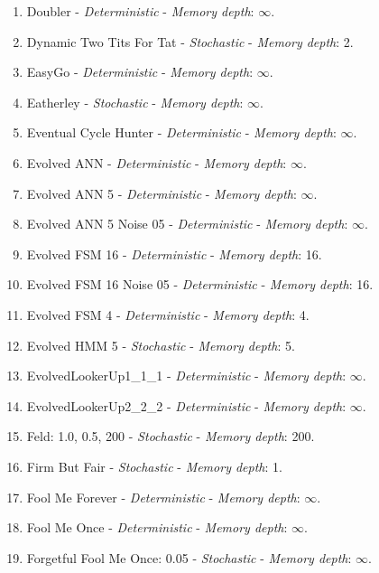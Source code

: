 \documentclass[10pt,letterpaper]{article}
\begin{document}
\begin{enumerate}
\item Doubler - \textit{Deterministic} - \textit{Memory depth}: \(\infty\). \cite{Prison1998}
\item Dynamic Two Tits For Tat - \textit{Stochastic} - \textit{Memory depth}: 2. \cite{axelrodproject}
\item EasyGo - \textit{Deterministic} - \textit{Memory depth}: \(\infty\). \cite{Li2011, Prison1998}
\item Eatherley - \textit{Stochastic} - \textit{Memory depth}: \(\infty\). \cite{Axelrod1980b}
\item Eventual Cycle Hunter - \textit{Deterministic} - \textit{Memory depth}: \(\infty\). \cite{axelrodproject}
\item Evolved ANN - \textit{Deterministic} - \textit{Memory depth}: \(\infty\). \cite{axelrodproject}
\item Evolved ANN 5 - \textit{Deterministic} - \textit{Memory depth}: \(\infty\). \cite{axelrodproject}
\item Evolved ANN 5 Noise 05 - \textit{Deterministic} - \textit{Memory depth}: \(\infty\). \cite{axelrodproject}
\item Evolved FSM 16 - \textit{Deterministic} - \textit{Memory depth}: 16. \cite{axelrodproject}
\item Evolved FSM 16 Noise 05 - \textit{Deterministic} - \textit{Memory depth}: 16. \cite{axelrodproject}
\item Evolved FSM 4 - \textit{Deterministic} - \textit{Memory depth}: 4. \cite{axelrodproject}
\item Evolved HMM 5 - \textit{Stochastic} - \textit{Memory depth}: 5. \cite{axelrodproject}
\item EvolvedLookerUp1\_1\_1 - \textit{Deterministic} - \textit{Memory depth}: \(\infty\). \cite{axelrodproject}
\item EvolvedLookerUp2\_2\_2 - \textit{Deterministic} - \textit{Memory depth}: \(\infty\). \cite{axelrodproject}
\item Feld: 1.0, 0.5, 200 - \textit{Stochastic} - \textit{Memory depth}: 200. \cite{Axelrod1980}
\item Firm But Fair - \textit{Stochastic} - \textit{Memory depth}: 1. \cite{Frean1994}
\item Fool Me Forever - \textit{Deterministic} - \textit{Memory depth}: \(\infty\). \cite{axelrodproject}
\item Fool Me Once - \textit{Deterministic} - \textit{Memory depth}: \(\infty\). \cite{axelrodproject}
\item Forgetful Fool Me Once: 0.05 - \textit{Stochastic} - \textit{Memory depth}: \(\infty\). \cite{axelrodproject}

\end{enumerate}
\end{document}
